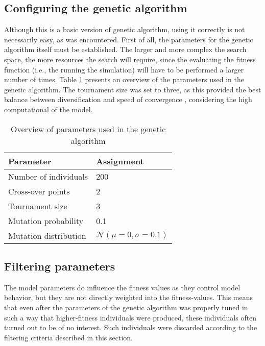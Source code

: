 \subsection{Configuring the genetic algorithm}\label{section:ga_parameters}
Although this is a basic version of genetic algorithm, using it correctly is not necessarily easy, as was encountered. First of all, the parameters for the genetic algorithm itself must be established. The larger and more complex the search space, the more resources the search will require, since the evaluating the fitness function (i.e., the running the simulation) will have to be performed a larger number of times. Table \ref{table:genetic_algorithm_parameters} presents an overview of the parameters used in the genetic algorithm. The tournament size was set to three, as this provided the best balance between diversification and speed of convergence \cite{blickle1995comparison, goldberg1991comparative}, considering the high computational  of the model.

\begin{table}
	\centering
	\begin{tabular}{l|l}
		Parameter & Assignment\\\hline
		Number of individuals & 200\\
		Cross-over points & 2\\
		Tournament size & 3\\
		Mutation probability & 0.1\\
		Mutation distribution &  $\mathcal{N}(\mu = 0, \sigma = 0.1)$\\
	\end{tabular}
	\caption{Overview of parameters used in the genetic algorithm}
	\label{table:genetic_algorithm_parameters}
\end{table}



\subsection{Filtering parameters}\label{section:filtering_parameters}

The model parameters do influence the fitness values as they control model behavior, but they are not directly weighted into the fitness-values. This means that even after the parameters of the genetic algorithm was properly tuned in such a way that higher-fitness individuals were produced, these individuals often turned out to be of no interest. Such individuals were discarded according to the filtering criteria described in this section.

